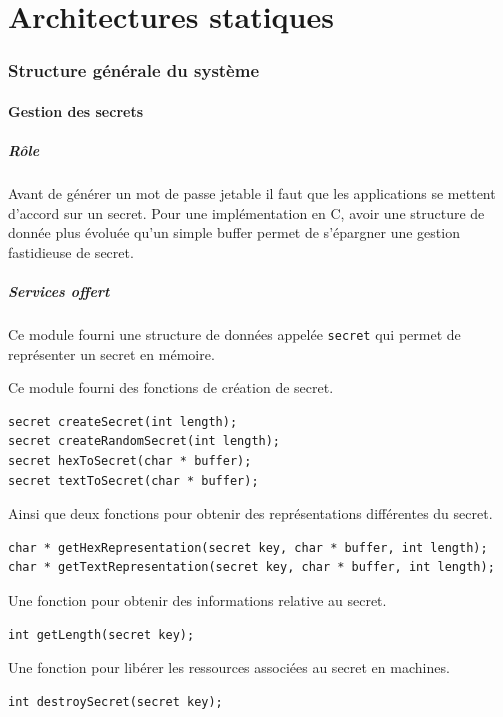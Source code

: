 \documentclass{"../../res/univ-projet"}
\begin{document}
\part*{Architectures statiques}
\section{Structure générale du système}

\subsection{Gestion des secrets}
\subsubsection{Rôle}
Avant de générer un mot de passe jetable il faut que les applications se mettent
d'accord sur un secret. Pour une implémentation en C, avoir une structure de donnée
plus évoluée qu'un simple buffer permet de s'épargner une gestion fastidieuse de secret.

\subsubsection{Services offert}
Ce module fourni une structure de données appelée \verb?secret? qui permet de représenter
un secret en mémoire.

Ce module fourni des fonctions de création de secret.
\begin{lstlisting}
secret createSecret(int length);
secret createRandomSecret(int length);
secret hexToSecret(char * buffer);
secret textToSecret(char * buffer);
\end{lstlisting}
Ainsi que deux fonctions pour obtenir des représentations différentes du secret.
\begin{lstlisting}
char * getHexRepresentation(secret key, char * buffer, int length);
char * getTextRepresentation(secret key, char * buffer, int length);
\end{lstlisting}
Une fonction pour obtenir des informations relative au secret.
\begin{lstlisting}
int getLength(secret key);
\end{lstlisting}
Une fonction pour libérer les ressources associées au secret en machines.
\begin{lstlisting}
int destroySecret(secret key);
\end{lstlisting}
\end{document}
